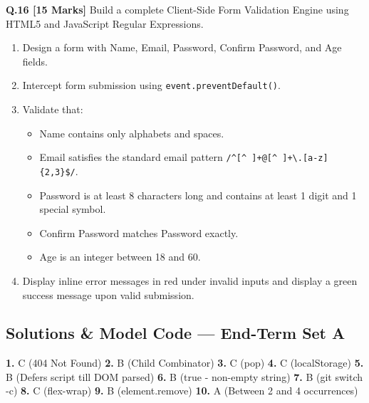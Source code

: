 \vspace{3mm}
\noindent\textbf{Q.16 [15 Marks]} Build a complete Client-Side Form Validation Engine using HTML5 and JavaScript Regular Expressions.
\begin{enumerate}[label=(\alph*), leftmargin=8mm]
  \item Design a form with Name, Email, Password, Confirm Password, and Age fields.
  \item Intercept form submission using \texttt{event.preventDefault()}.
  \item Validate that:
    \begin{itemize}
      \item Name contains only alphabets and spaces.
      \item Email satisfies the standard email pattern \texttt{/\textasciicircum[\textasciicircum\ ]+@[\textasciicircum\ ]+\textbackslash.[a-z]\{2,3\}\$/}.
      \item Password is at least 8 characters long and contains at least 1 digit and 1 special symbol.
      \item Confirm Password matches Password exactly.
      \item Age is an integer between 18 and 60.
    \end{itemize}
  \item Display inline error messages in red under invalid inputs and display a green success message upon valid submission.
\end{enumerate}

\newpage
\subsection*{Solutions \& Model Code --- End-Term Set A}

\begin{solutionbox}
\textbf{1.} C (404 Not Found) \quad \textbf{2.} B (Child Combinator) \quad \textbf{3.} C (pop) \quad \textbf{4.} C (localStorage) \quad \textbf{5.} B (Defers script till DOM parsed) \quad \textbf{6.} B (true - non-empty string) \quad \textbf{7.} B (git switch -c) \quad \textbf{8.} C (flex-wrap) \quad \textbf{9.} B (element.remove) \quad \textbf{10.} A (Between 2 and 4 occurrences)
\end{solutionbox}

